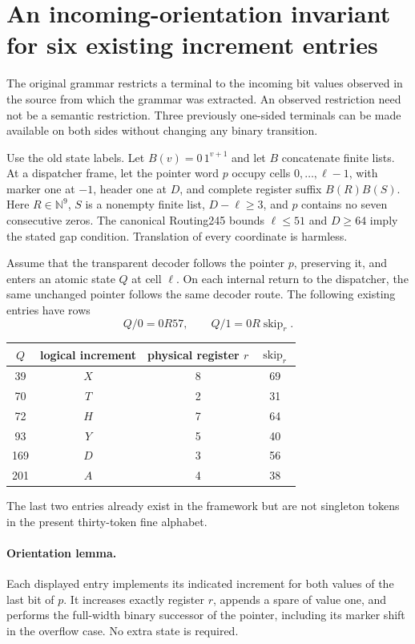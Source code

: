\section{An incoming-orientation invariant for six existing increment entries}
\label{sec:increment-orientation}

The original grammar restricts a terminal to the incoming bit values observed
in the source from which the grammar was extracted. An observed restriction
need not be a semantic restriction. Three previously one-sided terminals can
be made available on both sides without changing any binary transition.

Use the old state labels. Let $B(v)=0\,1^{v+1}$ and let $B$ concatenate finite
lists. At a dispatcher frame, let the pointer word $p$ occupy cells
$0,\ldots,\ell-1$, with marker one at $-1$, header one at $D$, and complete
register suffix $B(R)B(S)$. Here $R\in\mathbb N^9$, $S$ is a nonempty finite
list, $D-\ell\geq3$, and $p$ contains no seven consecutive zeros. The
canonical Routing245 bounds $\ell\leq51$ and $D\geq64$ imply the stated gap
condition. Translation of every coordinate is harmless.

Assume that the transparent decoder follows the pointer $p$, preserving it,
and enters an atomic state $Q$ at cell $\ell$. On each internal return to
the dispatcher, the same unchanged pointer follows the same decoder route.
The following existing entries have rows
\[
 Q/0=0R57,\qquad Q/1=0R\operatorname{skip}_r.
\]
\begin{center}
\begin{tabular}{c|c|c|c}
$Q$&logical increment&physical register $r$&$\operatorname{skip}_r$\\\hline
39&$X$&8&69\\
70&$T$&2&31\\
72&$H$&7&64\\
93&$Y$&5&40\\
169&$D$&3&56\\
201&$A$&4&38
\end{tabular}
\end{center}
The last two entries already exist in the framework but are not singleton
tokens in the present thirty-token fine alphabet.

\paragraph{Orientation lemma.}
Each displayed entry implements its indicated increment for both values of
the last bit of $p$. It increases exactly register $r$, appends a spare of
value one, and performs the full-width binary successor of the pointer,
including its marker shift in the overflow case. No extra state is required.

